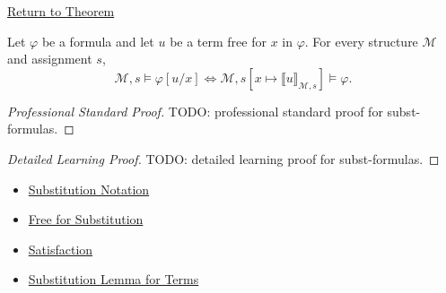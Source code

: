 \newpage
{}
\label{prf:subst-formulas}

\begin{remark*}[Return]
\hyperref[lem:subst-formulas]{Return to Theorem}
\end{remark*}

\begin{lemma*}
Let \(\varphi\) be a formula and let \(u\) be a term free for \(x\) in
\(\varphi\). For every structure \(\mathcal M\) and assignment \(s\),
\[
\mathcal M,s\models\varphi[u/x]
\Longleftrightarrow
\mathcal M,s[x\mapsto\llbracket u\rrbracket_{\mathcal M,s}]\models\varphi.
\]
\end{lemma*}

\begin{proof}[Professional Standard Proof]
\LRAProofBodyStart
TODO: professional standard proof for subst-formulas.
\end{proof}

\begin{proof}[Detailed Learning Proof]
\LRAProofBodyStart
TODO: detailed learning proof for subst-formulas.
\end{proof}

\begin{remark*}
\end{remark*}

\begin{dependencies}
\begin{itemize}
  \item \hyperref[def:subst-notation]{Substitution Notation}
  \item \hyperref[def:free-for]{Free for Substitution}
  \item \hyperref[def:fol-satisfaction]{Satisfaction}
  \item \hyperref[lem:subst-terms]{Substitution Lemma for Terms}
\end{itemize}
\end{dependencies}

\clearpage
